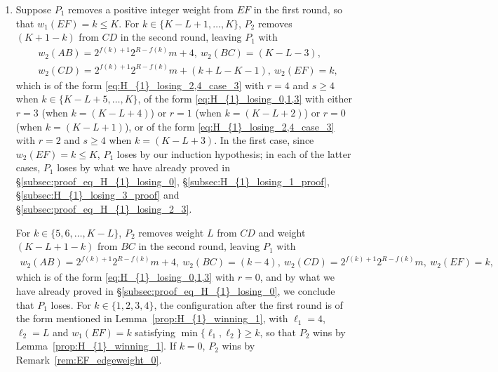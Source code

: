 \documentclass[11pt,reqno]{amsart}
\theoremstyle{definition}
\theoremstyle{definition}
\begin{document}
\begin{enumerate}
\begin{enumerate}
\item Finally, if $w_{1}(AB)=2^{R+1}n+\ell_{1}$ for some $n<m$ and $\ell_{1}\in\{0,1,\ldots,2^{R+1}-1\}$, the configuration after the first round is of the form given by Lemma~\ref{prop:H_{1}_winning_1} with $m_{1}=n$, $m_{2}=m$ and $\ell_{2}=L$. Since $n<m \implies m_{1}\neq m_{2}$, $P_{2}$ wins by Lemma~\ref{prop:H_{1}_winning_1}.
\end{enumerate}

\item Suppose $P_{1}$ removes a positive integer weight from $EF$ in the first round, so that $w_{1}(EF)=k\leqslant K$. For $k \in \{K-L+1,\ldots,K\}$, $P_{2}$ removes $(K+1-k)$ from $CD$ in the second round, leaving $P_{1}$ with
\begin{align}
{}&w_{2}(AB)=2^{f(k)+1}2^{R-f(k)}m+4,\ w_{2}(BC)=(K-L-3),\nonumber\\
{}&w_{2}(CD)=2^{f(k)+1}2^{R-f(k)}m+(k+L-K-1),\ w_{2}(EF)=k,\nonumber
\end{align}
which is of the form \eqref{eq:H_{1}_losing_2,4_case_3} with $r=4$ and $s\geqslant 4$ when $k\in\{K-L+5,\ldots,K\}$, of the form \eqref{eq:H_{1}_losing_0,1,3} with either $r=3$ (when $k=(K-L+4)$) or $r=1$ (when $k=(K-L+2)$) or $r=0$ (when $k=(K-L+1)$), or of the form \eqref{eq:H_{1}_losing_2,4_case_3} with $r=2$ and $s\geqslant 4$ when $k=(K-L+3)$. In the first case, since $w_{2}(EF)=k\leqslant K$, $P_{1}$ loses by our induction hypothesis; in each of the latter cases, $P_{1}$ loses by what we have already proved in \S\ref{subsec:proof_eq_H_{1}_losing_0}, \S\ref{subsec:H_{1}_losing_1_proof}, \S\ref{subsec:H_{1}_losing_3_proof} and \S\ref{subsec:proof_eq_H_{1}_losing_2_3}.

For $k \in \{5,6,\ldots,K-L\}$, $P_{2}$ removes weight $L$ from $CD$ and weight $(K-L+1-k)$ from $BC$ in the second round, leaving $P_{1}$ with 
\begin{align}
w_{2}(AB)=2^{f(k)+1}2^{R-f(k)}m+4,\ w_{2}(BC)=(k-4),\ w_{2}(CD)=2^{f(k)+1}2^{R-f(k)}m,\ w_{2}(EF)=k,\nonumber
\end{align}
which is of the form \eqref{eq:H_{1}_losing_0,1,3} with $r=0$, and by what we have already proved in \S\ref{subsec:proof_eq_H_{1}_losing_0}, we conclude that $P_{1}$ loses. For $k \in \{1,2,3,4\}$, the configuration after the first round is of the form mentioned in Lemma~\ref{prop:H_{1}_winning_1}, with $\ell_{1}=4$, $\ell_{2}=L$ and $w_{1}(EF)=k$ satisfying $\min\{\ell_{1},\ell_{2}\}\geqslant k$, so that $P_{2}$ wins by Lemma~\ref{prop:H_{1}_winning_1}. If $k=0$, $P_{2}$ wins by Remark~\ref{rem:EF_edgeweight_0}.


\end{enumerate}
\end{document}
